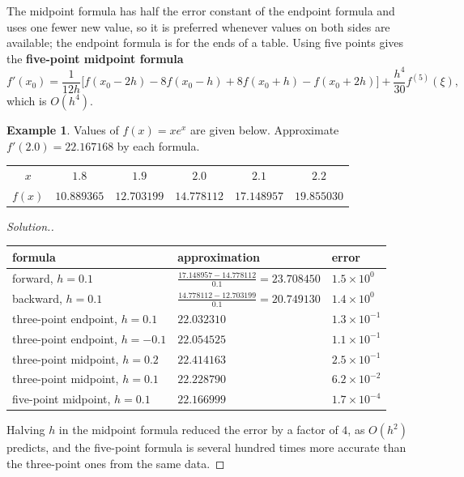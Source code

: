 \documentclass[11pt,a4paper]{article}
\numberwithin{equation}{section}
\theoremstyle{definition}
\newtheorem{exa}[thm]{Example}
\newenvironment{solution}
  {\renewcommand{\qedsymbol}{}\begin{proof}[\textit{Solution}.]}
  {\end{proof}}
\begin{document}
The midpoint formula has half the error constant of the endpoint formula and uses one fewer new value, so it is preferred whenever values on
both sides are available; the endpoint formula is for the ends of a table. Using five points gives the \textbf{five-point midpoint formula}
$$f'(x_0) = \frac{1}{12h}\bigl[f(x_0-2h)-8f(x_0-h)+8f(x_0+h)-f(x_0+2h)\bigr]+\frac{h^4}{30}f^{(5)}(\xi),$$
which is $O(h^4)$.

\begin{exa}
\label{exa:numdiff}
Values of $f(x) = xe^x$ are given below. Approximate $f'(2.0) = 22.167168$ by each formula.
\begin{center}
\begin{tabular}{cccccc}
\hline
$x$ & $1.8$ & $1.9$ & $2.0$ & $2.1$ & $2.2$\\
$f(x)$ & $10.889365$ & $12.703199$ & $14.778112$ & $17.148957$ & $19.855030$\\
\hline
\end{tabular}
\end{center}
\end{exa}

\begin{solution}
\begin{center}
\begin{tabular}{lll}
\hline
formula & approximation & error\\
\hline
forward, $h = 0.1$ & $\frac{17.148957-14.778112}{0.1} = 23.708450$ & $1.5\times10^{0}$\\
backward, $h = 0.1$ & $\frac{14.778112-12.703199}{0.1} = 20.749130$ & $1.4\times10^{0}$\\
three-point endpoint, $h = 0.1$ & $22.032310$ & $1.3\times10^{-1}$\\
three-point endpoint, $h = -0.1$ & $22.054525$ & $1.1\times10^{-1}$\\
three-point midpoint, $h = 0.2$ & $22.414163$ & $2.5\times10^{-1}$\\
three-point midpoint, $h = 0.1$ & $22.228790$ & $6.2\times10^{-2}$\\
five-point midpoint, $h = 0.1$ & $22.166999$ & $1.7\times10^{-4}$\\
\hline
\end{tabular}
\end{center}
Halving $h$ in the midpoint formula reduced the error by a factor of $4$, as $O(h^2)$ predicts, and the five-point formula is several hundred
times more accurate than the three-point ones from the same data.
\end{solution}
\end{document}
